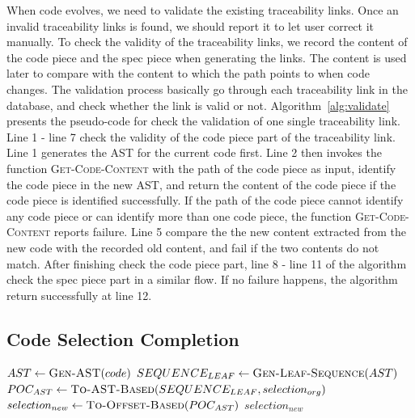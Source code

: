 
When code evolves, we need to validate the existing traceability links.
Once an invalid traceability links is found, we should report it to let user correct it manually.
To check the validity of the traceability links, we record the content of the code piece and the spec piece when generating the links.
The content is used later to compare with the content to which the path points to when code changes.
The validation process basically go through each traceability link in the database, 
and check whether the link is valid or not.
Algorithm~\ref{alg:validate} presents the pseudo-code for check the validation of one single traceability link.
Line 1 - line 7 check the validity of the code piece part of the traceability link.
Line 1 generates the AST for the current code first.
Line 2 then invokes the function \textsc{Get-Code-Content} with the path of the code piece as input, identify the code piece in the new AST, and return the content of the code piece if the code piece is identified successfully.
If the path of the code piece cannot identify any code piece or can identify more than one code piece, the function \textsc{Get-Code-Content} reports failure.
Line 5 compare the the new content extracted from the new code with the recorded old content, and fail if the two contents do not match.
After finishing check the code piece part, line 8 - line 11 of the algorithm check the spec piece part in a similar flow.
If no failure happens, the algorithm return successfully at line 12.


\subsection{Code Selection Completion}

\begin{algorithm}[!h]
\DontPrintSemicolon
{}
$AST \leftarrow \textsc{Gen-AST}(code)$\;
$SEQUENCE_{LEAF} \leftarrow \textsc{Gen-Leaf-Sequence}(AST)$\;
$POC_{AST} \leftarrow \textsc{To-AST-Based}(SEQUENCE_{LEAF}, selection_{org})$\;
$selection_{new} \leftarrow \textsc{To-Offset-Based}(POC_{AST})$\;
\Return $selection_{new}$\;
\caption{$\textsc{Complete-Code-Selection}(selection_{org})$}
\label{alg:completion}
\end{algorithm}

